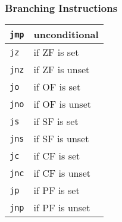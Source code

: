 \documentclass[dvipsnames]{beamer}
\begin{document}
\begin{frame}
  \frametitle{Branching Instructions}

  \begin{table}
    \begin{tabular}{ll}
      \lstinline|jmp| & unconditional\\
      \hline
      \lstinline|jz|  & if ZF is set\\
      \hline
      \lstinline|jnz| & if ZF is unset\\
      \hline
      \lstinline|jo|  & if OF is set\\
      \hline
      \lstinline|jno| & if OF is unset\\
      \hline
      \lstinline|js|  & if SF is set\\
      \hline
      \lstinline|jns| & if SF is unset\\
      \hline
      \lstinline|jc|  & if CF is set\\
      \hline
      \lstinline|jnc| & if CF is unset\\
      \hline
      \lstinline|jp|  & if PF is set\\
      \hline
      \lstinline|jnp| & if PF is unset\\
    \end{tabular}
  \end{table}
\end{frame}
\end{document}
